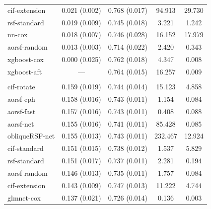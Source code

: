 \documentclass{article}\usepackage[]{graphicx}\usepackage[]{xcolor}
\newenvironment{knitrout}{}{} %
\begin{document}
\begin{knitrout}
\begin{longtable}[t]{lcccc}
\hspace{1em}cif-extension & 0.021 (0.002) & 0.768 (0.017) & 94.913 & 29.730\\
\hspace{1em}rsf-standard & 0.019 (0.009) & 0.745 (0.018) & 3.221 & 1.242\\
\hspace{1em}nn-cox & 0.018 (0.007) & 0.746 (0.028) & 16.152 & 17.979\\
\hspace{1em}aorsf-random & 0.013 (0.003) & 0.714 (0.022) & 2.420 & 0.343\\
\hspace{1em}xgboost-cox & 0.000 (0.025) & 0.762 (0.018) & 4.347 & 0.008\\
\hspace{1em}xgboost-aft & --- & 0.764 (0.015) & 16.257 & 0.009\\
\addlinespace[0.3em]
\multicolumn{5}{l}{\textit{\textbf{Monoclonal gammopathy; death, n = 1384, p = 8}}}\\
\hline
\hspace{1em}cif-rotate & 0.159 (0.019) & 0.744 (0.014) & 15.123 & 4.858\\
\hspace{1em}aorsf-cph & 0.158 (0.016) & 0.743 (0.011) & 1.154 & 0.084\\
\hspace{1em}aorsf-fast & 0.157 (0.016) & 0.743 (0.011) & 0.408 & 0.088\\
\hspace{1em}aorsf-net & 0.155 (0.016) & 0.741 (0.011) & 85.428 & 0.085\\
\hspace{1em}obliqueRSF-net & 0.155 (0.013) & 0.743 (0.011) & 232.467 & 12.924\\
\hspace{1em}cif-standard & 0.151 (0.015) & 0.738 (0.012) & 1.537 & 5.829\\
\hspace{1em}rsf-standard & 0.151 (0.017) & 0.737 (0.011) & 2.281 & 0.194\\
\hspace{1em}aorsf-random & 0.146 (0.013) & 0.735 (0.011) & 1.757 & 0.084\\
\hspace{1em}cif-extension & 0.143 (0.009) & 0.747 (0.013) & 11.222 & 4.744\\
\hspace{1em}glmnet-cox & 0.137 (0.021) & 0.726 (0.014) & 0.136 & 0.003\\

\end{longtable}
\end{knitrout}
\end{document}
